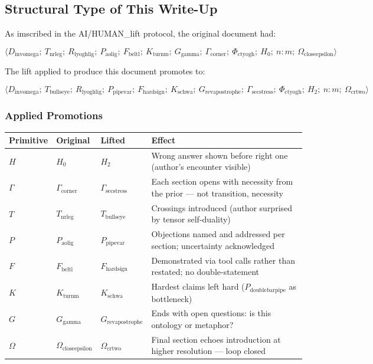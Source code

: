 \documentclass[12pt,a4paper]{article}
\begin{document}
\subsection{Structural Type of This Write-Up}

As imscribed in the AI/HUMAN\_lift protocol, the original document had:

\[\langle D_{\text{invomega}};\ T_{\text{nrleg}};\ R_{\text{lyoghlig}};\ P_{\text{aolig}};\ F_{\text{beltl}};\ K_{\text{turnm}};\ G_{\text{gamma}};\ \Gamma_{\text{corner}};\ \Phi_{\text{ctyogh}};\ H_0;\ n{:}m;\ \Omega_{\text{closeepsilon}} \rangle\]

The lift applied to produce this document promotes to:

\[\langle D_{\text{invomega}};\ T_{\text{bullseye}};\ R_{\text{lyoghlig}};\ P_{\text{pipevar}};\ F_{\text{hardsign}};\ K_{\text{schwa}};\ G_{\text{revapostrophe}};\ \Gamma_{\text{secstress}};\ \Phi_{\text{ctyogh}};\ H_2;\ n{:}m;\ \Omega_{\text{crtwo}} \rangle\]

\subsubsection{Applied Promotions}

\begin{table}[htbp]
\centering
\small
{}
\begin{tabularx}{\textwidth}{>{\centering\arraybackslash}X >{\centering\arraybackslash}X >{\centering\arraybackslash}X >{\centering\arraybackslash}X}
\toprule
\rowcolor{gray!25}\textbf{Primitive} & \textbf{Original} & \textbf{Lifted} & \textbf{Effect} \\
\midrule
\rowcolors{1}{white}{gray!10}
$H$ & $H_0$ & $H_2$ & Wrong answer shown before right one (author's encounter visible) \\
$\Gamma$ & $\Gamma_{\text{corner}}$ & $\Gamma_{\text{secstress}}$ & Each section opens with necessity from the prior --- not transition, necessity \\
$T$ & $T_{\text{nrleg}}$ & $T_{\text{bullseye}}$ & Crossings introduced (author surprised by tensor self-duality) \\
$P$ & $P_{\text{aolig}}$ & $P_{\text{pipevar}}$ & Objections named and addressed per section; uncertainty acknowledged \\
$F$ & $F_{\text{beltl}}$ & $F_{\text{hardsign}}$ & Demonstrated via tool calls rather than restated; no double-statement \\
$K$ & $K_{\text{turnm}}$ & $K_{\text{schwa}}$ & Hardest claims left hard ($P_{\text{doublebarpipe}}$ as bottleneck) \\
$G$ & $G_{\text{gamma}}$ & $G_{\text{revapostrophe}}$ & Ends with open questions: is this ontology or metaphor? \\
$\Omega$ & $\Omega_{\text{closeepsilon}}$ & $\Omega_{\text{crtwo}}$ & Final section echoes introduction at higher resolution --- loop closed \\
\bottomrule
\end{tabularx}
\end{table}
\end{document}
